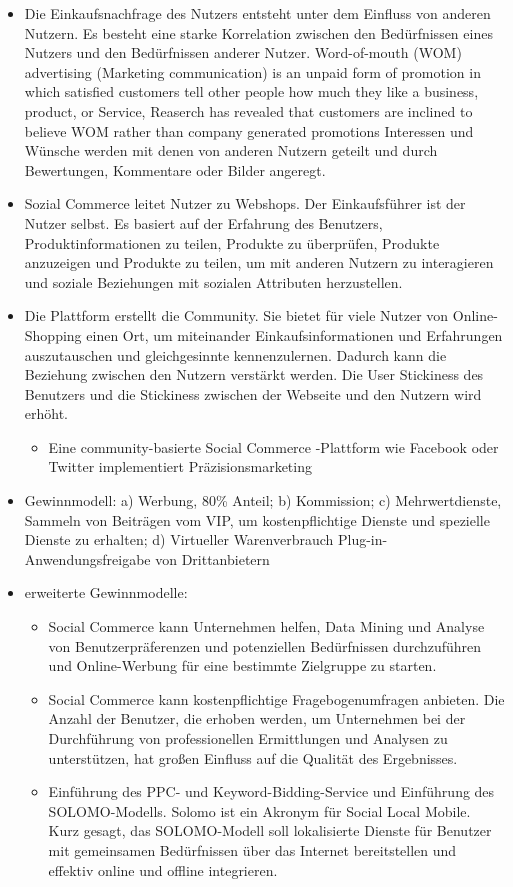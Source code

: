 \begin{itemize}
\item Die Einkaufsnachfrage des Nutzers entsteht unter dem Einfluss von anderen Nutzern. Es besteht eine starke Korrelation zwischen den Bedürfnissen eines Nutzers und den Bedürfnissen anderer Nutzer. Word-of-mouth (WOM) advertising (Marketing communication) is \glqq{}an unpaid form of promotion in which satisfied customers tell other people how much they like a business, product, or Service\grqq{}, \glqq{}Reaserch has revealed that customers are inclined to believe WOM rather than company generated promotions\grqq{} \parencite[S. 58]{turban:sc} Interessen und Wünsche werden mit denen von anderen Nutzern geteilt und durch Bewertungen, Kommentare oder Bilder angeregt.
\item Sozial Commerce leitet Nutzer zu Webshops. Der Einkaufsführer ist der Nutzer selbst. Es basiert auf der Erfahrung des Benutzers, Produktinformationen zu teilen, Produkte zu überprüfen, Produkte anzuzeigen und Produkte zu teilen, um mit anderen Nutzern zu interagieren und soziale Beziehungen mit sozialen Attributen herzustellen.
\item Die Plattform erstellt die Community. Sie bietet für viele Nutzer von Online-Shopping einen Ort, um miteinander Einkaufsinformationen und Erfahrungen auszutauschen und gleichgesinnte kennenzulernen. Dadurch kann die Beziehung zwischen den Nutzern verstärkt werden. Die User Stickiness des Benutzers und die Stickiness zwischen der Webseite und den Nutzern wird erhöht.

\begin{itemize}
\item Eine community-basierte Social Commerce -Plattform wie Facebook oder Twitter implementiert Präzisionsmarketing
\end{itemize}

\item Gewinnmodell: a) Werbung, 80\% Anteil; b) Kommission; c)  Mehrwertdienste, Sammeln von Beiträgen vom VIP, um kostenpflichtige Dienste und spezielle Dienste zu erhalten; d)  Virtueller Warenverbrauch Plug-in-Anwendungsfreigabe von Drittanbietern
\item erweiterte Gewinnmodelle:

\begin{itemize}
\item Social Commerce kann Unternehmen helfen, Data Mining und Analyse von Benutzerpräferenzen und potenziellen Bedürfnissen durchzuführen und Online-Werbung für eine bestimmte Zielgruppe zu starten.
\item Social Commerce kann kostenpflichtige Fragebogenumfragen anbieten. Die Anzahl der Benutzer, die erhoben werden, um Unternehmen bei der Durchführung von professionellen Ermittlungen und Analysen zu unterstützen, hat großen Einfluss auf die Qualität des Ergebnisses.
\item Einführung des PPC- und Keyword-Bidding-Service und Einführung des SOLOMO-Modells. Solomo ist ein Akronym für Social Local Mobile. Kurz gesagt, das SOLOMO-Modell soll lokalisierte Dienste für Benutzer mit gemeinsamen Bedürfnissen über das Internet bereitstellen und effektiv online und offline integrieren.
\end{itemize}


\end{itemize}
